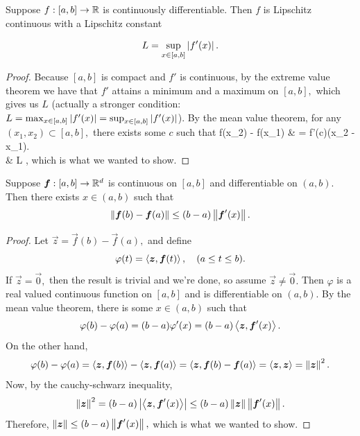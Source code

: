 \documentclass{article}
\begin{document}
\begin{theorem}
	Suppose $f : [a,b] \to \mathbb{R}$ is \@{continuously differentiable}. Then $f$ is \@{Lipschitz continuous} with a \@{Lipschitz constant}

	\[ L = \sup_{x \in [a,b]} \left| f'(x) \right|. \]
\end{theorem}
\begin{proof}
	Because $[a,b]$ is \@{compact} and $f'$ is \@{continuous}, by the \@{extreme value theorem} we have that $f'$ attains a minimum and a maximum on $[a,b],$ which gives us $L$ (actually a stronger condition: $L = \max_{x \in [a,b]} \left| f'(x) \right| = \sup_{x \in [a,b]} \left| f'(x) \right|$). By the \@{mean value theorem}, for any $(x_1, x_2) \subset [a,b],$ there exists some $c$ such that
	\bal
	f(x_2) - f(x_1) & = f'(c)(x_2 - x_1). \\
	 & \leq L ,
	\eal
	which is what we wanted to show.
\end{proof}

\begin{theorem}
	Suppose $\boldsymbol{f}: [a,b] \to \mathbb{R}^d$ is \@{continuous} on $[a,b]$ and \@{differentiable} on $(a,b).$ Then there exists $x \in (a,b)$ such that
	\[ \left\lVert \boldsymbol{f}(b) - \boldsymbol{f}(a) \right\rVert \leq (b - a)\left\lVert \boldsymbol{f}'(x) \right\rVert. \]
\end{theorem}
\begin{proof}
	Let $\vec{z} = \vec{f}(b) - \vec{f}(a),$ and define
	\[ \varphi(t) = \left\langle \boldsymbol{z}, \boldsymbol{f}(t) \right\rangle, \quad (a \leq t \leq b). \]
	If $\vec{z} = \vec{0},$ then the result is trivial and we're done, so assume $\vec{z} \neq \vec{0}.$
	Then $\varphi$ is a real valued \@{continuous} function on $[a,b]$ and is \@{differentiable} on $(a,b).$ By the \@{mean value theorem}, there is some $x \in (a,b)$ such that
	\[ \varphi(b) - \varphi(a) = (b - a) \varphi'(x) = (b - a) \left\langle \boldsymbol{z}, \boldsymbol{f}'(x) \right\rangle. \]
	On the other hand,
	\[ \varphi(b) - \varphi(a) = \left\langle \boldsymbol{z}, \boldsymbol{f}(b) \right\rangle - \left\langle \boldsymbol{z}, \boldsymbol{f}(a) \right\rangle
	    = \left\langle \boldsymbol{z}, \boldsymbol{f}(b) - \boldsymbol{f}(a) \right\rangle = \left\langle \boldsymbol{z}, \boldsymbol{z} \right\rangle = \left\lVert \boldsymbol{z} \right\rVert^2. \]
	Now, by the \@{cauchy-schwarz inequality},
	\[ \left\lVert \boldsymbol{z} \right\rVert^2 = (b - a) \left| \left\langle \boldsymbol{z}, \boldsymbol{f}'(x) \right\rangle \right| \leq (b-a)\left\lVert \boldsymbol{z} \right\rVert\left\lVert \boldsymbol{f}'(x) \right\rVert. \]
	Therefore, $\left\lVert \boldsymbol{z} \right\rVert \leq (b - a)\left\lVert \boldsymbol{f}'(x) \right\rVert,$ which is what we wanted to show.
\end{proof}
\end{document}
